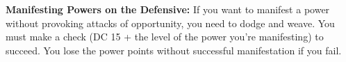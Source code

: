 



\textbf{Manifesting Powers on the Defensive:} If you want to manifest a power without provoking attacks of opportunity, you need to dodge and weave. You must make a  check (DC 15 + the level of the power you're manifesting) to succeed. You lose the power points without successful manifestation if you fail.

